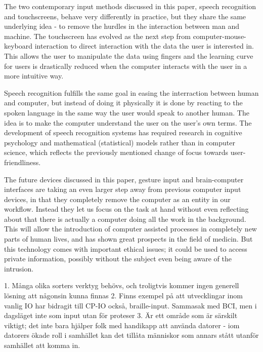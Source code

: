 
The two contemporary input methods discussed in this paper, speech recognition and touchscreens, behave very differently in practice, but they share the same underlying idea - to remove the hurdles in the interaction between man and machine. The touchscreen has evolved as the next step from computer-mouse-keyboard interaction to direct interaction with the data the user is interested in. This allows the user to manipulate the data using fingers and the learning curve for users is drastically reduced when the computer interacts with the user in a more intuitive way.

Speech recognition fulfills the same goal in easing the interraction between human and computer, but instead of doing it physically it is done by reacting to the spoken language in the same way the user would speak to another human. The idea is to make the computer understand the user on the user's own terms. The development of speech recognition systems has required research in cognitive psychology and mathematical (statistical) models rather than in computer science, which reflects the previously mentioned change of focus towards user-friendliness. 


The future devices discussed in this paper, gesture input and brain-computer interfaces are taking an even larger step away from previous computer input devices, in that they completely remove the computer as an entity in our workflow. Instead they let us focus on the task at hand without even reflecting about that there is actually a computer doing all the work in the background. This will allow the introduction of computer assisted processes in completely new parts of human lives, and has shown great prospects in the field of medicin. But this technology comes with important ethical issues; it could be used to access private information, possibly without the subject even being aware of the intrusion.


1. Många olika sorters verktyg behövs, och troligtvis kommer ingen generell lösning att någonsin kunna finnas
2. Finns exempel på att utvecklingar inom vanlig IO har bidragit till CP-IO också, braille-input. Sammasak med BCI, men i dagsläget inte som input utan för proteser
3. Är ett område som är särskilt viktigt; det inte bara hjälper folk med handikapp att använda datorer - iom datorers ökade roll i samhället kan det tillåta människor som annars stått utanför samhället att komma in.


